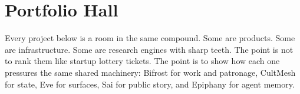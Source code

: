 \chapter{Portfolio Hall}

Every project below is a room in the same compound. Some are products. Some are infrastructure. Some are research engines with sharp teeth. The point is not to rank them like startup lottery tickets. The point is to show how each one pressures the same shared machinery: Bifrost for work and patronage, CultMesh for state, Eve for surfaces, Sai for public story, and Epiphany for agent memory.




















